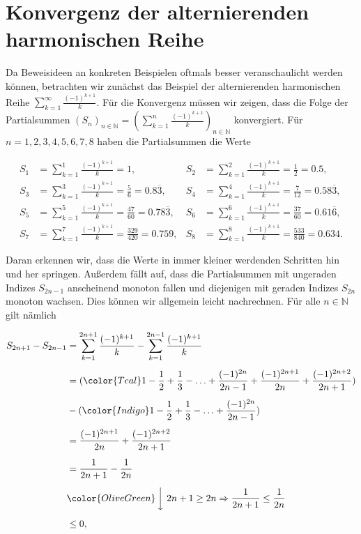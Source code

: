 \documentclass[fontsize=9pt,
               parskip=half-,
               DIV=14,
               listof=chapterentry,
               tocflat]{scrbook}
\begin{document}
\section{Konvergenz der alternierenden harmonischen Reihe}

Da Beweisideen an konkreten Beispielen oftmals besser veranschaulicht werden können, betrachten wir zunächst das Beispiel der alternierenden harmonischen Reihe $\sum _{k=1}^{\infty }{\frac {(-1)^{k+1}}{k}}$. Für die Konvergenz müssen wir zeigen, dass die Folge der Partialsummen $(S_{n})_{n\in \mathbb {N} }=\left(\sum _{k=1}^{n}{\frac {(-1)^{k+1}}{k}}\right)_{n\in \mathbb {N} }$ konvergiert. Für $n=1,2,3,4,5,6,7,8$ haben die Partialsummen die Werte

\begin{align*}
S_{1}&=\sum _{k=1}^{1}{\frac {(-1)^{k+1}}{k}}=1,&S_{2}&=\sum _{k=1}^{2}{\frac {(-1)^{k+1}}{k}}={\frac {1}{2}}=0.5,\\S_{3}&=\sum _{k=1}^{3}{\frac {(-1)^{k+1}}{k}}={\frac {5}{6}}=0.8{\overline {3}},&S_{4}&=\sum _{k=1}^{4}{\frac {(-1)^{k+1}}{k}}={\frac {7}{12}}=0.58{\overline {3}},\\S_{5}&=\sum _{k=1}^{5}{\frac {(-1)^{k+1}}{k}}={\frac {47}{60}}=0.78{\overline {3}},&S_{6}&=\sum _{k=1}^{6}{\frac {(-1)^{k+1}}{k}}={\frac {37}{60}}=0.61{\overline {6}},\\S_{7}&=\sum _{k=1}^{7}{\frac {(-1)^{k+1}}{k}}={\frac {329}{420}}=0.759,&S_{8}&=\sum _{k=1}^{8}{\frac {(-1)^{k+1}}{k}}={\frac {533}{840}}=0.634.
\end{align*}

Daran erkennen wir, dass die Werte in immer kleiner werdenden Schritten hin und her springen. Außerdem fällt auf, dass die Partialsummen mit ungeraden Indizes $S_{2n-1}$ anscheinend monoton fallen und diejenigen mit geraden Indizes $S_{2n}$ monoton wachsen. Dies können wir allgemein leicht nachrechnen. Für alle $n\in \mathbb {N} $ gilt nämlich

\begin{align*}
S_{2n+1}-S_{2n-1}&=\sum _{k=1}^{2n+1}{\frac {(-1)^{k+1}}{k}}-\sum _{k=1}^{2n-1}{\frac {(-1)^{k+1}}{k}}\\[0.5em]&=({\color {Teal}1-{\frac {1}{2}}+{\frac {1}{3}}-\ldots +{\frac {(-1)^{2n}}{2n-1}}}+{\frac {(-1)^{2n+1}}{2n}}+{\frac {(-1)^{2n+2}}{2n+1}})\\[0.5em]&-({\color {Indigo}1-{\frac {1}{2}}+{\frac {1}{3}}-\ldots +{\frac {(-1)^{2n}}{2n-1}}})\\[0.5em]&={\frac {(-1)^{2n+1}}{2n}}+{\frac {(-1)^{2n+2}}{2n+1}}\\[0.5em]&={\frac {1}{2n+1}}-{\frac {1}{2n}}\\[0.5em]&{\color {OliveGreen}\left\downarrow \ 2n+1\geq 2n\Rightarrow {\frac {1}{2n+1}}\leq {\frac {1}{2n}}\right.}\\[0.5em]&\leq 0,
\end{align*}
\end{document}
